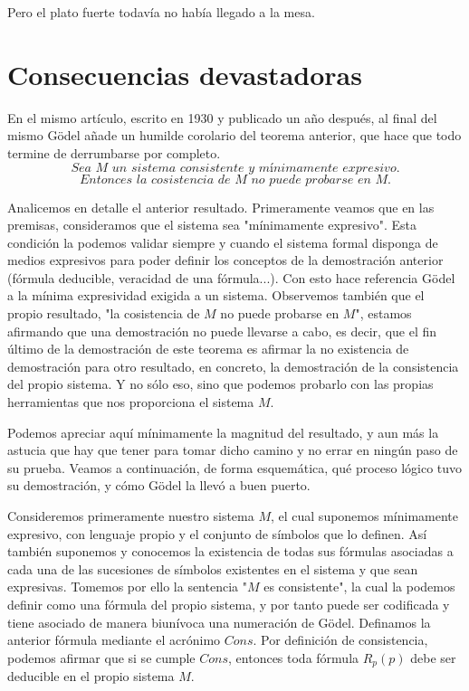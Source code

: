 Pero el plato fuerte todavía no había llegado a la mesa.

\section{Consecuencias devastadoras}

En el mismo artículo, escrito en 1930 y publicado un año después, al final del mismo Gödel añade un humilde corolario del teorema anterior, que hace que todo termine de derrumbarse por completo. 
\begin{equation}\label{th:God_Incomp_II}
    \textit{Sea $M$ un sistema consistente y mínimamente expresivo.}
\end{equation}
\begin{equation}
    \textit{Entonces la cosistencia de $M$ no puede probarse en $M$.} 
\end{equation}

Analicemos en detalle el anterior resultado. Primeramente veamos que en las premisas, consideramos que el sistema sea "mínimamente expresivo". Esta condición la podemos validar siempre y cuando el sistema formal disponga de medios expresivos para poder definir los conceptos
de la demostración anterior (fórmula deducible, veracidad de una fórmula...). Con esto hace referencia Gödel a la mínima expresividad exigida a un sistema. Observemos también que el propio resultado, "la cosistencia de $M$ no puede probarse en $M$",
estamos afirmando que una demostración no puede llevarse a cabo, es decir, que el fin último de la demostración de este teorema es afirmar la no existencia de demostración para otro resultado, en concreto, la demostración de la consistencia del propio sistema.
Y no sólo eso, sino que podemos probarlo con las propias herramientas que nos proporciona el sistema $M$.

Podemos apreciar aquí mínimamente la magnitud del resultado, y aun más la astucia que hay que tener para tomar dicho camino y no errar en ningún paso de su prueba. Veamos a continuación, de forma esquemática, qué proceso lógico tuvo su demostración, 
y cómo Gödel la llevó a buen puerto.

Consideremos primeramente nuestro sistema $M$, el cual suponemos mínimamente expresivo, con lenguaje propio y el conjunto de símbolos que lo definen. Así también suponemos y conocemos la existencia de todas sus fórmulas asociadas a cada una de las sucesiones de símbolos
existentes en el sistema y que sean expresivas. Tomemos por ello la sentencia "$M$ es consistente", la cual la podemos definir como una fórmula del propio sistema, y por tanto puede ser codificada y tiene asociado de manera biunívoca una numeración de Gödel. 
Definamos la anterior fórmula mediante el acrónimo $Cons$. Por definición de consistencia, podemos afirmar que si se cumple $Cons$, entonces toda fórmula $R_p(p)$ debe ser deducible en el propio sistema $M$.

